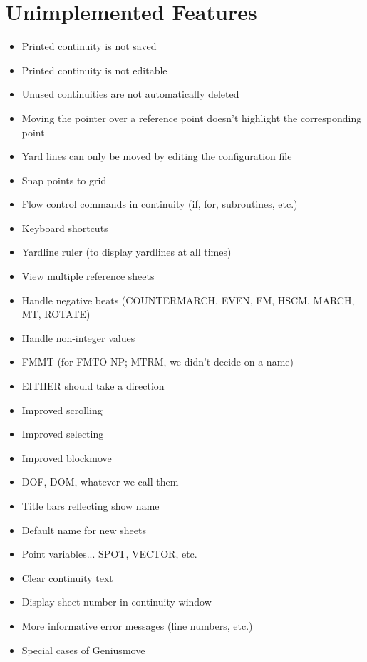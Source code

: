 \section{Unimplemented Features}\label{notdone}

\begin{itemize}\itemsep=0pt
\item Printed continuity is not saved
\item Printed continuity is not editable
\item Unused continuities are not automatically deleted
\item Moving the pointer over a reference point doesn't highlight the
corresponding point
\item Yard lines can only be moved by editing the configuration file
\item Snap points to grid
\item Flow control commands in continuity (if, for, subroutines, etc.)
\item Keyboard shortcuts
\item Yardline ruler (to display yardlines at all times)
\item View multiple reference sheets
\item Handle negative beats (COUNTERMARCH, EVEN, FM, HSCM, MARCH, MT, ROTATE)
\item Handle non-integer values
\item FMMT (for FMTO NP; MTRM, we didn't decide on a name)
\item EITHER should take a direction
\item Improved scrolling
\item Improved selecting
\item Improved blockmove
\item DOF, DOM, whatever we call them
\item Title bars reflecting show name
\item Default name for new sheets
\item Point variables... SPOT, VECTOR, etc.
\item Clear continuity text
\item Display sheet number in continuity window
\item More informative error messages (line numbers, etc.)
\item Special cases of Geniusmove
\end{itemize}
